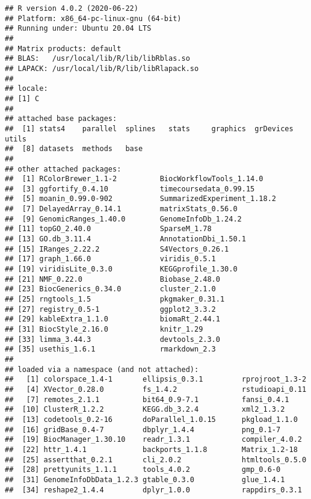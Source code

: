 \documentclass[9pt,a4paper,]{extarticle}
\begin{document}
\begin{verbatim}
## R version 4.0.2 (2020-06-22)
## Platform: x86_64-pc-linux-gnu (64-bit)
## Running under: Ubuntu 20.04 LTS
## 
## Matrix products: default
## BLAS:   /usr/local/lib/R/lib/libRblas.so
## LAPACK: /usr/local/lib/R/lib/libRlapack.so
## 
## locale:
## [1] C
## 
## attached base packages:
##  [1] stats4    parallel  splines   stats     graphics  grDevices utils    
##  [8] datasets  methods   base     
## 
## other attached packages:
##  [1] RColorBrewer_1.1-2          BiocWorkflowTools_1.14.0   
##  [3] ggfortify_0.4.10            timecoursedata_0.99.15     
##  [5] moanin_0.99.0-902           SummarizedExperiment_1.18.2
##  [7] DelayedArray_0.14.1         matrixStats_0.56.0         
##  [9] GenomicRanges_1.40.0        GenomeInfoDb_1.24.2        
## [11] topGO_2.40.0                SparseM_1.78               
## [13] GO.db_3.11.4                AnnotationDbi_1.50.1       
## [15] IRanges_2.22.2              S4Vectors_0.26.1           
## [17] graph_1.66.0                viridis_0.5.1              
## [19] viridisLite_0.3.0           KEGGprofile_1.30.0         
## [21] NMF_0.22.0                  Biobase_2.48.0             
## [23] BiocGenerics_0.34.0         cluster_2.1.0              
## [25] rngtools_1.5                pkgmaker_0.31.1            
## [27] registry_0.5-1              ggplot2_3.3.2              
## [29] kableExtra_1.1.0            biomaRt_2.44.1             
## [31] BiocStyle_2.16.0            knitr_1.29                 
## [33] limma_3.44.3                devtools_2.3.0             
## [35] usethis_1.6.1               rmarkdown_2.3              
## 
## loaded via a namespace (and not attached):
##   [1] colorspace_1.4-1       ellipsis_0.3.1         rprojroot_1.3-2       
##   [4] XVector_0.28.0         fs_1.4.2               rstudioapi_0.11       
##   [7] remotes_2.1.1          bit64_0.9-7.1          fansi_0.4.1           
##  [10] ClusterR_1.2.2         KEGG.db_3.2.4          xml2_1.3.2            
##  [13] codetools_0.2-16       doParallel_1.0.15      pkgload_1.1.0         
##  [16] gridBase_0.4-7         dbplyr_1.4.4           png_0.1-7             
##  [19] BiocManager_1.30.10    readr_1.3.1            compiler_4.0.2        
##  [22] httr_1.4.1             backports_1.1.8        Matrix_1.2-18         
##  [25] assertthat_0.2.1       cli_2.0.2              htmltools_0.5.0       
##  [28] prettyunits_1.1.1      tools_4.0.2            gmp_0.6-0             
##  [31] GenomeInfoDbData_1.2.3 gtable_0.3.0           glue_1.4.1            
##  [34] reshape2_1.4.4         dplyr_1.0.0            rappdirs_0.3.1        

\end{verbatim}
\end{document}
